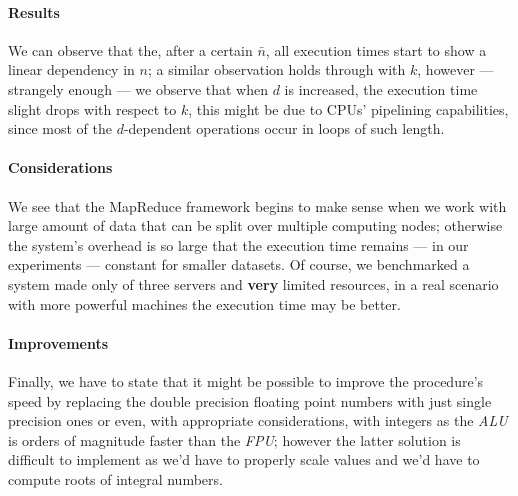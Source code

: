 \documentclass[parskip=full]{report}
\begin{document}
\paragraph{Results}
We can observe that the, after a certain $\bar{n}$, all execution times start to show a linear dependency in $n$; a similar observation holds through with $k$, however --- strangely enough --- we observe that when $d$ is increased, the execution time slight drops with respect to $k$, this might be due to CPUs' pipelining capabilities, since most of the $d$-dependent operations occur in loops of such length.

\paragraph{Considerations}
We see that the MapReduce framework begins to make sense when we work with large amount of data that can be split over multiple computing nodes; otherwise the system's overhead is so large that the execution time remains --- in our experiments --- constant for smaller datasets. Of course, we benchmarked a system made only of three servers and \textbf{very} limited resources, in a real scenario with more powerful machines the execution time may be better.

\paragraph{Improvements}
Finally, we have to state that it might be possible to improve the procedure's speed by replacing the double precision floating point numbers with just single precision ones or even, with appropriate considerations, with integers as the \textit{ALU} is orders of magnitude faster than the \textit{FPU}; however the latter solution is difficult to implement as we'd have to properly scale values and we'd have to compute roots of integral numbers.

\end{document}
